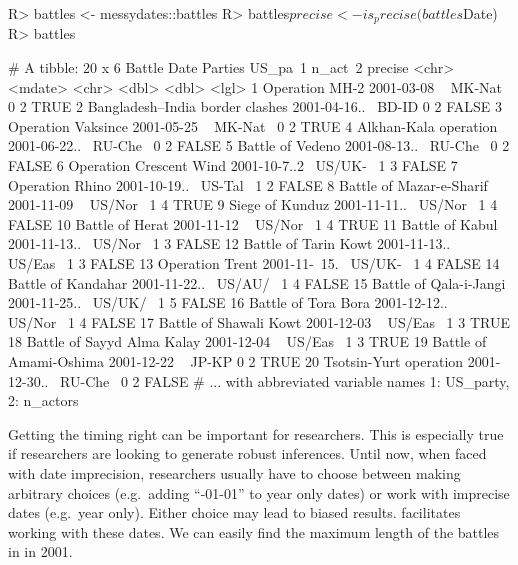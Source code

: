 \documentclass[
]{jss}
\begin{document}
\begin{CodeChunk}
\begin{CodeInput}
R> battles <- messydates::battles
R> battles$precise <- is_precise(battles$Date)
R> battles
\end{CodeInput}
\begin{CodeOutput}
# A tibble: 20 x 6
   Battle                          Date          Parties US_pa~1 n_act~2 precise
   <chr>                           <mdate>       <chr>     <dbl>   <dbl> <lgl>  
 1 Operation MH-2                  2001-03-08  ~ MK-Nat~       0       2 TRUE   
 2 Bangladesh–India border clashes 2001-04-16..~ BD-ID         0       2 FALSE  
 3 Operation Vaksince              2001-05-25  ~ MK-Nat~       0       2 TRUE   
 4 Alkhan-Kala operation           2001-06-22..~ RU-Che~       0       2 FALSE  
 5 Battle of Vedeno                2001-08-13..~ RU-Che~       0       2 FALSE  
 6 Operation Crescent Wind         2001-10-7..2~ US/UK-~       1       3 FALSE  
 7 Operation Rhino                 2001-10-19..~ US-Tal~       1       2 FALSE  
 8 Battle of Mazar-e-Sharif        2001-11-09  ~ US/Nor~       1       4 TRUE   
 9 Siege of Kunduz                 2001-11-11..~ US/Nor~       1       4 FALSE  
10 Battle of Herat                 2001-11-12  ~ US/Nor~       1       4 TRUE   
11 Battle of Kabul                 2001-11-13..~ US/Nor~       1       3 FALSE  
12 Battle of Tarin Kowt            2001-11-13..~ US/Eas~       1       3 FALSE  
13 Operation Trent                 2001-11-~15.~ US/UK-~       1       4 FALSE  
14 Battle of Kandahar              2001-11-22..~ US/AU/~       1       4 FALSE  
15 Battle of Qala-i-Jangi          2001-11-25..~ US/UK/~       1       5 FALSE  
16 Battle of Tora Bora             2001-12-12..~ US/Nor~       1       4 FALSE  
17 Battle of Shawali Kowt          2001-12-03  ~ US/Eas~       1       3 TRUE   
18 Battle of Sayyd Alma Kalay      2001-12-04  ~ US/Eas~       1       3 TRUE   
19 Battle of Amami-Oshima          2001-12-22  ~ JP-KP         0       2 TRUE   
20 Tsotsin-Yurt operation          2001-12-30..~ RU-Che~       0       2 FALSE  
# ... with abbreviated variable names 1: US_party, 2: n_actors
\end{CodeOutput}
\end{CodeChunk}

Getting the timing right can be important for researchers. This is
especially true if researchers are looking to generate robust
inferences. Until now, when faced with date imprecision, researchers
usually have to choose between making arbitrary choices (e.g.~adding
``-01-01'' to year only dates) or work with imprecise dates (e.g.~year
only). Either choice may lead to biased results. 
facilitates working with these dates. We can easily find the maximum
length of the battles in in 2001.
\end{document}
